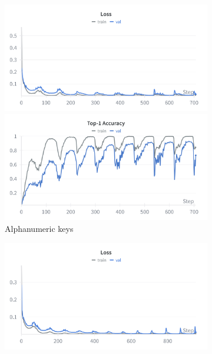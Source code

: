 \documentclass[a4paper,11pt,twoside]{report}
\theoremstyle{definition}
\begin{document}
\begin{figure}[H]
\centering

\begin{subfigure}{\linewidth}
    \centering
    \begin{minipage}{0.49\linewidth}
        \centering
        \includegraphics[width=\linewidth]{img_appendix/loss_all_moat_alphanum.png}
    \end{minipage}
    \hfill
    \begin{minipage}{0.49\linewidth}
        \centering
        \includegraphics[width=\linewidth]{img_appendix/acc_all_moat_alphanum.png}
    \end{minipage}
    \caption{Alphanumeric keys}
\end{subfigure}
\vspace{0.5em}
\begin{subfigure}{\linewidth}
    \centering
    \begin{minipage}{0.49\linewidth}
        \centering
        \includegraphics[width=\linewidth]{img_appendix/loss_all_moat_all.png}

\end{minipage}
\end{subfigure}
\end{figure}
\end{document}
